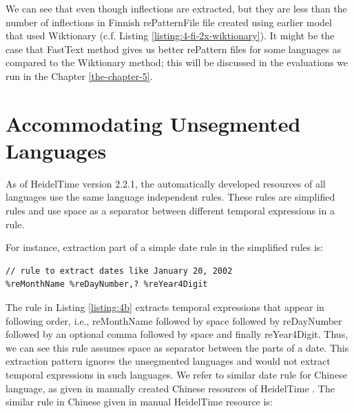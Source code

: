 We can see that even though inflections are extracted, but they are less than the number of inflections in Finnish rePatternFile file created using earlier model that used Wiktionary (c.f. Listing \ref{listing:4-fi-2x-wiktionary}). It might be the case that FastText method gives us better rePattern files for some languages as compared to the Wiktionary method; this will be discussed in the evaluations we run in the Chapter \ref{the-chapter-5}.

\section{Accommodating Unsegmented Languages} \label{sec4c}
As of HeidelTime version 2.2.1, the automatically developed resources of all languages use the same language independent rules. These rules are simplified rules and use space as a separator between different temporal expressions in a rule. 

For instance, extraction part of a simple date rule in the simplified rules is:\\



\begin{minipage}{\linewidth}
\begin{lstlisting}
// rule to extract dates like January 20, 2002
%reMonthName %reDayNumber,? %reYear4Digit
\end{lstlisting}
\end{minipage}


The rule in Listing \ref{listing:4b} extracts temporal expressions that appear in following order, i.e., reMonthName followed by space followed by reDayNumber followed by an optional comma followed by space and finally reYear4Digit. Thus, we can see this rule assumes space as separator between the parts of a date. This extraction pattern ignores the unsegmented languages and would not extract temporal expressions in such languages. We refer to similar date rule for Chinese language, as given in manually created Chinese resources of HeidelTime \cite{DBLP:conf/eacl/LiSZG14}. The similar rule in Chinese given in manual HeidelTime resource is:\\

